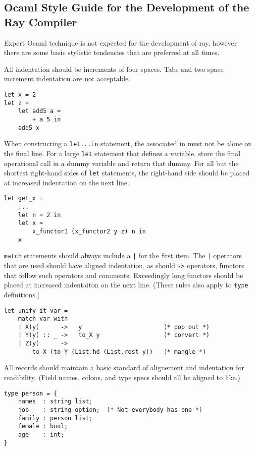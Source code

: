 \lstset{language=caml,frame=single,
  xleftmargin=\parindent}
\subsection*{Ocaml Style Guide for the Development of the Ray Compiler}

Expert Ocaml technique is not expected for the development of ray, however there are some basic stylistic tendencies that are preferred at all times.



All indentation should be increments of four spaces. Tabs and two space increment indentation are not acceptable.

\begin{lstlisting}
let x = 2
let z =
    let add5 a =
        + a 5 in
    add5 x
\end{lstlisting}



When constructing a \verb|let...in| statement, the associated in must not be alone on the final line. For a large \verb|let| statement that defines a variable, store the final operational call in a dummy variable and return that dummy. For all but the shortest right-hand sides of \verb|let| statements, the right-hand side should be placed at increased indentation on the next line.

\begin{lstlisting}
let get_x =
    ...
    let n = 2 in
    let x =
        x_functor1 (x_functor2 y z) n in
    x
\end{lstlisting}



\verb|match| statements should always include a \verb[|[ for the first item. The \verb[|[ operators that are used should have aligned indentation, as should \verb|->| operators, functors that follow such operators and comments. Exceedingly long functors should be placed at increased indentaiton on the next line. (These rules also apply to \verb|type| definitions.)

\begin{lstlisting}
let unify_it var =
    match var with
    | X(y)      ->   y                       (* pop out *)
    | Y(y) :: _ ->   to_X y                  (* convert *)
    | Z(y)      ->
        to_X (to_Y (List.hd (List.rest y))   (* mangle *)
\end{lstlisting}



All records should maintain a basic standard of alignement and indentation for readibility. (Field names, colons, and type specs should all be aligned to like.)

\begin{lstlisting}
type person = {
    names  : string list;
    job    : string option;  (* Not everybody has one *)
    family : person list;
    female : bool;
    age    : int;
}
\end{lstlisting}
